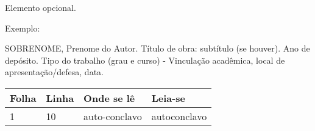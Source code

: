 
\begin{errata}
Elemento opcional. 

Exemplo:

\vspace{\onelineskip}

SOBRENOME, Prenome do Autor. Título de obra: subtítulo (se houver). Ano de depósito. Tipo do trabalho (grau e curso) - Vinculação acadêmica, local de apresentação/defesa, data.

\begin{table}[htb]
\center
\begin{tabular}{|p{2.4cm}|p{2cm}|p{3cm}|p{3cm}|}
  \hline
   \textbf{Folha} & \textbf{Linha}  & \textbf{Onde se lê}  & \textbf{Leia-se}  \\
    \hline
    1 & 10 & auto-conclavo & autoconclavo\\
   \hline
\end{tabular}
\end{table}

\end{errata}
